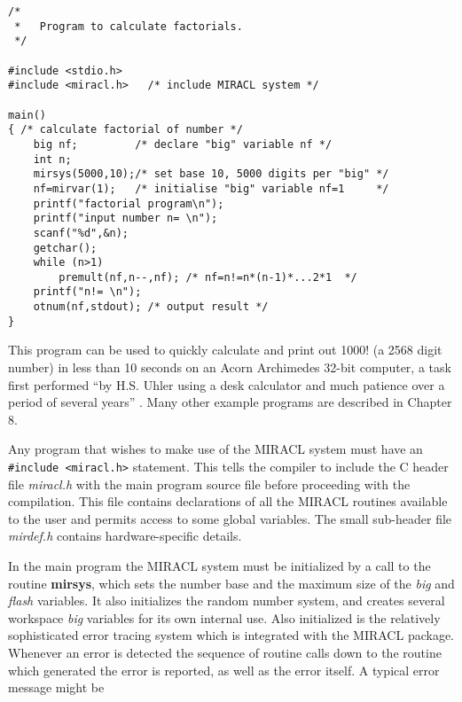 \begin{verbatim}
/*
 *   Program to calculate factorials.
 */

#include <stdio.h>
#include <miracl.h>   /* include MIRACL system */

main()
{ /* calculate factorial of number */
    big nf;         /* declare "big" variable nf */
    int n;
    mirsys(5000,10);/* set base 10, 5000 digits per "big" */
    nf=mirvar(1);   /* initialise "big" variable nf=1     */
    printf("factorial program\n");
    printf("input number n= \n");
    scanf("%d",&n);
    getchar();
    while (n>1) 
        premult(nf,n--,nf); /* nf=n!=n*(n-1)*...2*1  */
    printf("n!= \n");
    otnum(nf,stdout); /* output result */ 
}

\end{verbatim}

      This program can be used to quickly calculate and print out 1000!  (a 
      2568 digit number) in less than 10 seconds on an Acorn Archimedes 32-bit 
      computer,  a task  first 
      performed  ``by  H.S.  Uhler using a desk calculator and much patience 
      over a period of several years''  \cite{Knuth73}. Many other example 
      programs are described in Chapter 8.  

\vspace{5mm}

      Any  program  that wishes to make use of the  MIRACL  system  must have 
an {\tt \#include <miracl.h>} statement. This tells the compiler to include 
the C 
      header  file  {\em miracl.h}  with  the  main  program source file before 
      proceeding with the compilation.  This file  contains 
      declarations  of  all  the  MIRACL routines available to the user and 
      permits  access  to  some global variables. The small sub-header file 
      {\em mirdef.h} contains hardware-specific details.
                                                     
      In the main program the MIRACL system must be initialized by  a  call 
      to  the  routine {\bf mirsys}, which sets the number base and the maximum 
      size of the {\em big} and {\em flash} variables.  It also initializes the 
      random number system,  and creates several workspace {\em big} variables 
      for its own internal use. Also initialized is the relatively 
      sophisticated 
      error tracing system which is integrated with the MIRACL package.  
      Whenever an  error  is  detected  the  sequence  of  routine calls 
      down to the routine which generated the error is reported, as well as 
      the  error itself. A typical error message might be 

